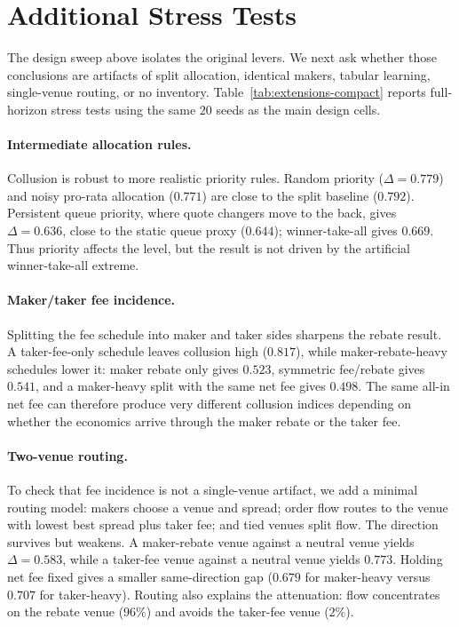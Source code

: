 \documentclass[sigconf]{acmart}
\begin{document}



\section{Additional Stress Tests}
\label{sec:extensions}

The design sweep above isolates the original levers. We next ask whether those conclusions are artifacts of split allocation, identical makers, tabular learning, single-venue routing, or no inventory. Table~\ref{tab:extensions-compact} reports full-horizon stress tests using the same $20$ seeds as the main design cells.

\paragraph{Intermediate allocation rules.} Collusion is robust to more realistic priority rules. Random priority ($\Delta=0.779$) and noisy pro-rata allocation ($0.771$) are close to the split baseline ($0.792$). Persistent queue priority, where quote changers move to the back, gives $\Delta=0.636$, close to the static queue proxy ($0.644$); winner-take-all gives $0.669$. Thus priority affects the level, but the result is not driven by the artificial winner-take-all extreme.

\paragraph{Maker/taker fee incidence.} Splitting the fee schedule into maker and taker sides sharpens the rebate result. A taker-fee-only schedule leaves collusion high ($0.817$), while maker-rebate-heavy schedules lower it: maker rebate only gives $0.523$, symmetric fee/rebate gives $0.541$, and a maker-heavy split with the same net fee gives $0.498$. The same all-in net fee can therefore produce very different collusion indices depending on whether the economics arrive through the maker rebate or the taker fee.

\paragraph{Two-venue routing.} To check that fee incidence is not a single-venue artifact, we add a minimal routing model: makers choose a venue and spread; order flow routes to the venue with lowest best spread plus taker fee; and tied venues split flow. The direction survives but weakens. A maker-rebate venue against a neutral venue yields $\Delta=0.583$, while a taker-fee venue against a neutral venue yields $0.773$. Holding net fee fixed gives a smaller same-direction gap ($0.679$ for maker-heavy versus $0.707$ for taker-heavy). Routing also explains the attenuation: flow concentrates on the rebate venue ($96\%$) and avoids the taker-fee venue ($2\%$).
\end{document}
